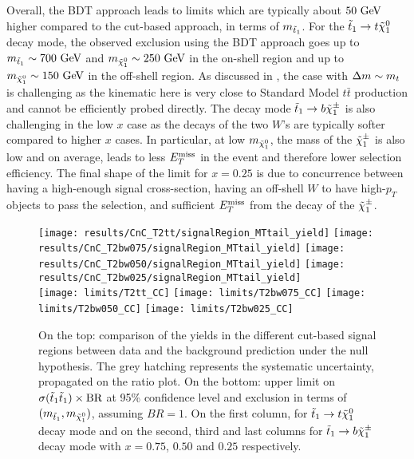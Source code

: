     Overall, the BDT approach leads to limits which are typically about $50~\text{GeV}$
    higher compared to the cut-based approach, in terms of $m_{\tilde{t}_1}$. For
    the $\tilde{t}_1 \rightarrow t \tilde{\chi}_1^0$ decay mode, the observed exclusion
    using the BDT approach goes up to $m_{\tilde{t}_1} \sim 700~\text{GeV}$ and
    $m_{\tilde{\chi}_1^0} \sim 250~\text{GeV}$ in the on-shell region and up to
    $m_{\tilde{\chi}_1^0} \sim 150~\text{GeV}$ in the off-shell region.  As discussed in
    , the case with $\Delta m \sim m_{t}$ is
    challenging as the kinematic here is very close to Standard Model $t\bar{t}$
    production and cannot be efficiently probed directly.  The decay mode
    $\tilde{t}_1 \rightarrow b \tilde{\chi}_1^\pm$ is also challenging in the low $x$ case as
    the decays of the two $W$'s are typically softer compared to higher $x$
    cases. In particular, at low $m_{\tilde{\chi}_1^0}$, the mass of the
    $\tilde{\chi}_1^\pm$ is also low and on average, leads to less $E_T^\text{miss}$ in the event
    and therefore lower selection efficiency. The final shape of the limit for
    $x = 0.25$ is due to concurrence between having a high-enough signal
    cross-section, having an off-shell $W$ to have high-$p_T$ objects to pass
    the selection, and sufficient $E_T^\text{miss}$ from the decay of the $\tilde{\chi}_1^\pm$.

    \begin{landscape}
        \thispagestyle{empty}
        \vspace*{1cm}
    \begin{figure}[h!]
        \centering
        \texttt{[image: results/CnC\_T2tt/signalRegion\_MTtail\_yield]}
        \texttt{[image: results/CnC\_T2bw075/signalRegion\_MTtail\_yield]}
        \texttt{[image: results/CnC\_T2bw050/signalRegion\_MTtail\_yield]}
        \texttt{[image: results/CnC\_T2bw025/signalRegion\_MTtail\_yield]}\\
        \texttt{[image: limits/T2tt\_CC]}
        \texttt{[image: limits/T2bw075\_CC]}
        \texttt{[image: limits/T2bw050\_CC]}
        \texttt{[image: limits/T2bw025\_CC]}
        \caption{On the top: comparison of the yields in the different cut-based
        signal regions between data and the background prediction under the null
        hypothesis. The grey hatching represents the systematic uncertainty,
        propagated on the ratio plot.  On the bottom: upper limit on
        $\sigma(\tilde{t}_1\tilde{t}_1) \times \text{BR}$ at 95\% confidence level and
        exclusion in terms of $(m_{\tilde{t}_1},m_{\tilde{\chi}_1^0})$, assuming
        $BR = 1$. On the first column, for $\tilde{t}_1 \rightarrow t \tilde{\chi}_1^0$
        decay mode and on the second, third and last columns for $\tilde{t}_1
        \rightarrow b \tilde{\chi}_1^\pm$ decay mode with $x=0.75$, $0.50$ and $0.25$
        respectively.}
        \label{fig:resultsCnC}
    \end{figure}
    \end{landscape}

